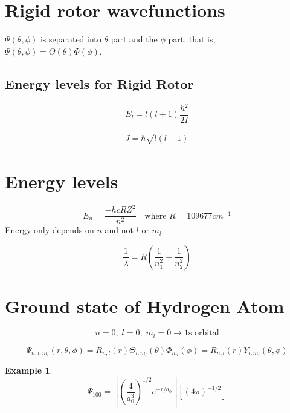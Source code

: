 \documentclass[12pt]{article}
\theoremstyle{definition}
\newtheorem*{example}{Example}
\begin{document}
\section{Rigid rotor wavefunctions}
$\Psi(\theta, \phi)$ is separated into $\theta$ part and the $\phi$ part, that is, $\varPsi(\theta, \phi) = \Theta(\theta)\Phi(\phi)$.

\subsection{Energy levels for Rigid Rotor}
\begin{equation*}
	E_l = l(l + 1) \frac{\hbar^2}{2I} 
\end{equation*}

\begin{align*}
	J = \hbar \sqrt{l(l+1)}
\end{align*}

\section{Energy levels}%
\label{cha:Energy levels}

\begin{equation*}
	E_n = \frac{ -hcRZ^2 }{n^2} \quad \textrm{where $R = 109677cm^{-1}$}
\end{equation*}
Energy only depends on $n$ and not $l$ or $m_l$.

\begin{equation*}
	\frac{1 }{\lambda } = R \left( \frac{1 }{n_1^2} - \frac{1 }{n_2^2}  \right)
\end{equation*}


\section{Ground state of Hydrogen Atom}%
\label{sec:Ground state of Hydrogen Atom}

\begin{equation*}
	n = 0,\;l = 0,\;m_l = 0 \rightarrow \textrm{1s orbital}
\end{equation*}

\begin{equation*}
	\Psi_{n, l, m_l}(r, \theta, \phi) = R_{n, l}(r) \Theta_{l, m_l}(\theta) \Phi_{m_l}(\phi) = R_{n, l}(r) Y_{l, m_l}(\theta, \phi)
\end{equation*}

\begin{example}
	\begin{equation*}
		\Psi_{100} = \left[ \left( \frac{4}{a_0^3} \right)^{1/2} e^{-r/a_0}  \right] \left[ \left( 4\pi \right)^{-1/2} \right]
	\end{equation*}
\end{example}
\end{document}
